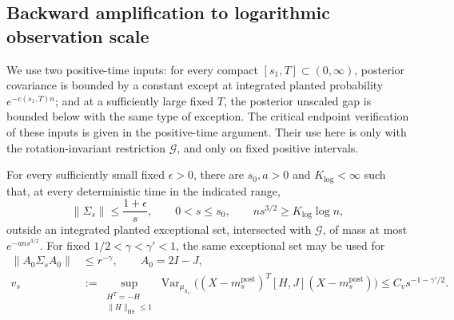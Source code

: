 \subsection{Backward amplification to logarithmic observation scale}
\label{prof:sec-amplification}

We use two positive-time inputs: for every compact
\([s_1,T]\subset(0,\infty)\), posterior covariance is bounded by a
constant except at integrated planted probability \(e^{-c(s_1,T)n}\);
and at a sufficiently large fixed \(T\), the posterior unscaled gap is
bounded below with the same type of exception.  The critical endpoint
verification of these inputs is given in the positive-time argument.
Their use here is only with the rotation-invariant restriction
\(\mathcal G\), and only on fixed positive intervals.

\begin{proposition}
\label{prof:prop-amplified-covariance}
For every sufficiently small fixed \(\epsilon>0\), there are
\(s_0,a>0\) and \(K_{\log}<\infty\) such that, at every deterministic
time in the indicated range,
\begin{equation}
 \|\Sigma_s\|\le\frac{1+\epsilon}{s},
 \qquad 0<s\le s_0,\qquad ns^{3/2}\ge K_{\log}\log n,
 \label{prof:eq22}
\end{equation}
outside an integrated planted exceptional set, intersected with
\(\mathcal G\), of mass at most \(e^{-ans^{3/2}}\).
For fixed \(1/2<\gamma<\gamma'<1\), the same exceptional set may be
used for
\begin{equation}
 \begin{split}
 \|A_0\Sigma_sA_0\|&\le r^{-\gamma},\qquad A_0=2I-J,\\
 v_s&:=\sup_{\substack{H^T=-H\\ \|H\|_{\mathrm{HS}}\le1}}
 \operatorname{Var}_{\mu_{h_s}}
 \bigl((X-m_s^{\mathrm{post}})^T[H,J](X-m_s^{\mathrm{post}})\bigr)
       \le C_v s^{-1-\gamma'/2}.
 \end{split}
 \label{prof:eq23}
\end{equation}
\end{proposition}

